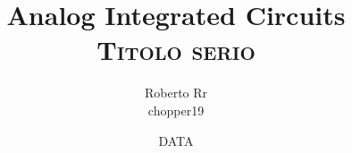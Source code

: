 \documentclass[11pt,a4paper,oneside,openright,titlepage]{article}
\title{	Analog Integrated Circuits \\
	\huge {\textsc{Titolo serio}}	}
\begin{document}
\author{Roberto Rr\\ chopper19\\
}
\date{DATA}
\maketitle 		
\tableofcontents
\newpage
\newpage
\newpage
\newpage
\newpage
\newpage
\newpage
\newpage
\end{document}
